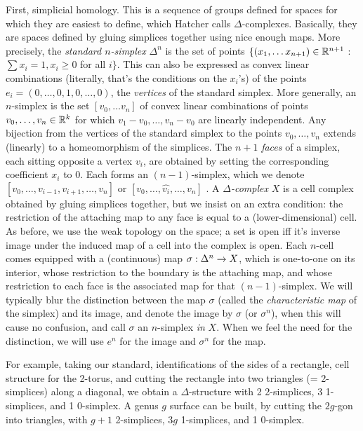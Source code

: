 \msk

First, simplicial homology. This is a sequence of groups defined for spaces
for which they are easiest to define, which Hatcher calls $\Delta$-complexes.
Basically, they are spaces defined by gluing simplices together using
nice enough maps. More precisely, the {\it standard $n$-simplex} $\Delta^n$ is
the set of points 
$\{(x_1,\ldots x_{n+1})\in{\Bbb R}^{n+1}$ : $\sum x_i=1 , x_i\geq 0$
 for all $i\}$. This can also be expressed as convex linear combinations
(literally, that's the conditions on the $x_i$'s) of the points
$e_i=(0,\ldots ,0,1,0,\ldots ,0)$, the {\it vertices} of the standard
simplex. More generally, an $n$-simplex is the set $[v_0,\ldots v_n]$ of
convex linear combinations of points $v_0,\ldots ,v_n\in{\Bbb R}^{k}$
for which $v_1-v_0,\ldots ,v_n-v_0$ are linearly independent.
Any bijection from the vertices of the standard simplex to the points
$v_0,\ldots ,v_n$ extends (linearly) to a homeomorphism of
the simplices. The $n+1$ {\it faces} of a simplex, each sitting opposite
a vertex $v_i$, are obtained by setting the corresponding coefficient $x_i$ to $0$. 
Each forms an $(n-1)$-simplex, which we denote 
$[v_0,\ldots,v_{i-1},v_{i+1},\ldots ,v_n]$ or
$[v_0,\ldots,\widehat{v_{i}},\ldots ,v_n]$ . A {\it $\Delta$-complex} $X$ is a cell
complex obtained by gluing simplices together, but we insist on an extra
condition:
the restriction of the attaching map to any face is equal to a (lower-dimensional)
cell. As before, we use the weak topology on the space; a set is open iff
it's inverse image under the induced map of a cell into the complex is open.
Each $n$-cell comes equipped with a (continuous) map
$\sigma:\Delta^n\rightarrow X$, which is one-to-one on its interior, whose restriction
to the boundary is the attaching map, and whose restriction to each face is the
associated map for that $(n-1)$-simplex. We will typically blur the 
distinction between the map $\sigma$ (called the {\it characteristic map}
of the simplex) and its image, and denote the
image by $\sigma$ (or $\sigma^n$), when this will cause no confusion,
and call $\sigma$ an $n$-simplex {\it in} $X$. When we feel the need for the 
distinction, we will use $e^n$ for the image and $\sigma^n$ for the map.

\ssk

For example, taking our standard,
identifications of the sides of a rectangle, cell structure for the 2-torus,
and cutting the rectangle into two triangles (= 2-simplices) along a diagonal,
we obtain a $\Delta$-structure with 2 2-simplices, 3 1-simplices, and 1 0-simplex.
A genus $g$ surface can be built, by cutting the $2g$-gon into triangles, with
$g+1$ 2-simplices, $3g$ 1-simplices, and 1 0-simplex.

